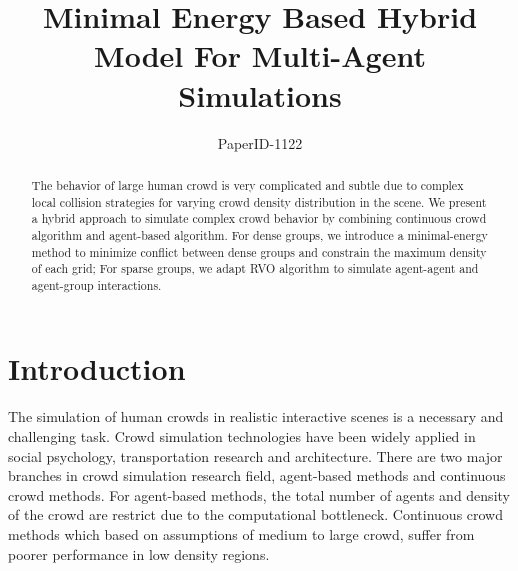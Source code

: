 \documentclass{egpubl}
\title{Minimal Energy Based Hybrid Model For Multi-Agent Simulations}
\author{PaperID-1122}
\begin{document}

\maketitle

\begin{abstract}

The behavior of large human crowd is very complicated and subtle due to complex local collision strategies for varying crowd density distribution in the scene. We present a hybrid approach to simulate complex crowd behavior by combining continuous crowd algorithm and agent-based algorithm. For dense groups, we introduce a minimal-energy method to minimize conflict between dense groups and constrain the maximum density of each grid; For sparse groups, we adapt RVO algorithm to simulate agent-agent and agent-group interactions.

\begin{classification} %
\end{classification}

\end{abstract}

\section{Introduction}

The simulation of human crowds in realistic interactive scenes is a necessary and challenging task. Crowd simulation technologies have been widely applied in social psychology, transportation research and architecture. There are two major branches in crowd simulation research field, agent-based methods and continuous crowd methods. For agent-based methods, the total number of agents and density of the crowd are restrict due to the computational bottleneck. Continuous crowd methods which based on assumptions of medium to large crowd, suffer from poorer performance in low density regions.
\end{document}
